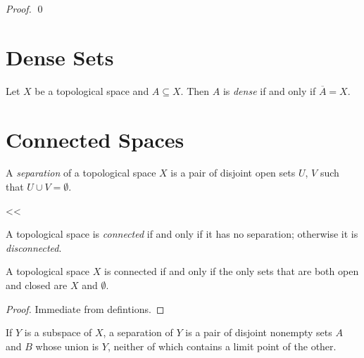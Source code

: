 \begin{proof}
    \pf
    \qed
\end{proof}

\section{Dense Sets}

\begin{definition}[Dense]
    Let $X$ be a topological space and $A \subseteq X$. Then $A$ is \emph{dense}
    if and only if $\overline{A} = X$.
\end{definition}

\section{Connected Spaces}

\begin{definition}[Separation]
    A \emph{separation} of a topological space $X$ is a pair of disjoint open sets $U$, $V$ such that $U \cup V = \emptyset$.
\end{definition}<<

\begin{definition}[Connected]
    A topological space is \emph{connected} if and only if it has no separation; otherwise it is \emph{disconnected}.
\end{definition}

\begin{proposition}
    \label{proposition:open_closed_connective}
    A topological space $X$ is connected if and only if the only sets that are both open and closed are $X$ and $\emptyset$.
\end{proposition}

\begin{proof}
    Immediate from defintions.
\end{proof}

\begin{lemma}
    \label{lemma:limit_point_separation}
    If $Y$ is a subspace of $X$, a separation of $Y$ is a pair of disjoint nonempty sets $A$ and $B$ whose union is $Y$, neither of which contains a limit point of the other.
\end{lemma}

